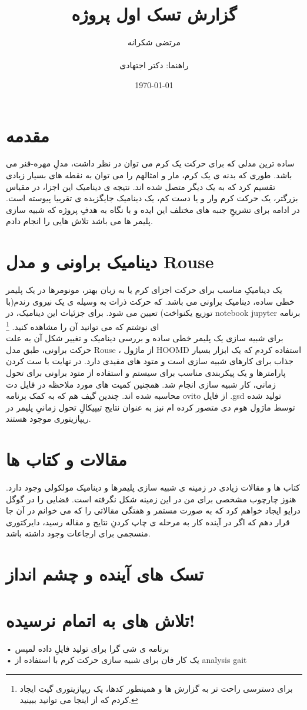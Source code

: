 \documentclass{article}
\author{مرتضی شکرانه \\ \\ راهنما: دکتر اجتهادی}
\title{گزارش تسک اول پروژه}
\date{\today}
\begin{document}
\maketitle	
\section{مقدمه} 
ساده ترین مدلی که برای حرکت یک کرم می توان در نظر داشت، مدلِ مهره-فنر می باشد. طوری که بدنه ی یک کرم، مار و امثالهم را می توان به نقطه های بسیار زیادی تقسیم کرد که به یک دیگر متصل شده اند. نتیجه ی دینامیک این اجزا، در مقیاس بزرگتر، یک حرکت کرم وار و یا دست کم، یک دینامیک جایگزیده ی تقربیا پیوسته است. 
در ادامه برای تشریحِ جنبه های مختلف این ایده و با نگاه به هدفِ پروژه که شبیه سازی پلیمر ها می باشد تلاش هایی را انجام دادم.     
\section{دینامیک براونی و مدل Rouse} 
یک دینامیکِ مناسب برای حرکت اجزای کرم یا به زبان بهتر، مونومرها در یک پلیمر خطی ساده، دینامیک براونی می باشد. که حرکت ذرات به وسیله ی یک نیروی رندم(با توزیع یکنواخت) تعیین می شود. برای جزئیات این دینامیک، در notebook jupyter برنامه ای نوشتم که می توانید آن را مشاهده کنید.
\footnote{برای دسترسی راحت تر به گزارش ها و همینطور کدها، یک ریپازیتوری گیت ایجاد کردم که از اینجا می توانید ببینید.}
\\برای شبیه سازی یک پلیمر خطی ساده و بررسی دینامیک و تغییر شکل آن به علت حرکت براونی، طبق مدل Rouse ، از ماژول HOOMD استفاده کردم که یک ابزار بسیار جذاب برای کارهای شبیه سازی است و متود های مفیدی دارد. در نهایت با ست کردن پارامترها و یک پیکربندی مناسب برای سیستم و استفاده از متود براونی برای تحول زمانی، کار شبیه سازی انجام شد. همچنین کمیت های مورد ملاحظه در فایل دت محاسبه شده اند. چندین گیف هم که به کمک برنامه ovito از فایل .gsd تولید شده توسط ماژول هوم دی متصور کرده ام نیز به عنوان نتایج تیپیکالِ تحول زمانیِ پلیمر در ریپازیتوری موجود هستند.   
\section{مقالات و کتاب ها} 
کتاب ها و مقالات زیادی در زمینه ی شبیه سازی پلیمرها و دینامیک مولکولی وجود دارد.
هنوز چارچوب مشخصی برای من در این زمینه شکل نگرفته است. فضایی را در گوگل درایو ایجاد خواهم کرد که به صورت مستمر و هفتگی مقالاتی را که می خوانم در آن جا قرار دهم که اگر در آینده کار به مرحله ی چاپ کردنِ نتایج و مقاله رسید، دایرکتوری منسجمی برای ارجاعات وجود داشته باشد.  
\section{تسک های آینده و چشم انداز} 
\section{تلاش های به اتمام نرسیده!}
• برنامه ی شی گرا برای تولید فایلِ داده لمپس \\
• یک کار فان برای شبیه سازی حرکت کرم با استفاده از analysis gait
\\
\end{document}
